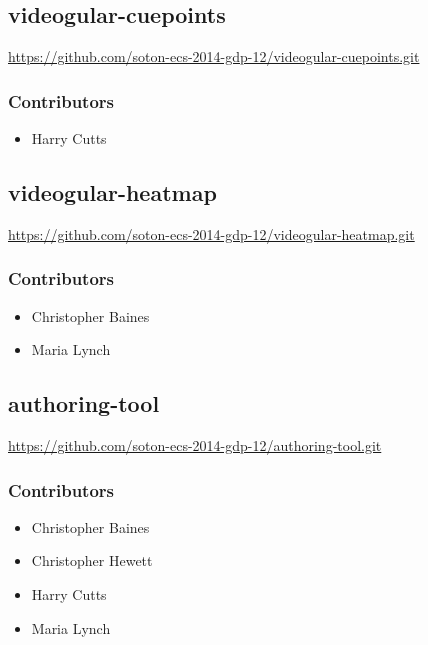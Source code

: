 \subsection{videogular-cuepoints}
\label{Section:Repo_videogular_cuepoints}

\url{https://github.com/soton-ecs-2014-gdp-12/videogular-cuepoints.git}

\subsubsection{Contributors}
\begin{itemize}
  \item Harry Cutts
\end{itemize}

\subsection{videogular-heatmap}
\label{Section:Repo_videogular_heatmap}

\url{https://github.com/soton-ecs-2014-gdp-12/videogular-heatmap.git}

\subsubsection{Contributors}
\begin{itemize}
  \item Christopher Baines
  \item Maria Lynch
\end{itemize}

\subsection{authoring-tool}
\label{Section:Repo_authoring_tool}

\url{https://github.com/soton-ecs-2014-gdp-12/authoring-tool.git}

\subsubsection{Contributors}
\begin{itemize}
  \item Christopher Baines
  \item Christopher Hewett
  \item Harry Cutts
  \item Maria Lynch
\end{itemize}

